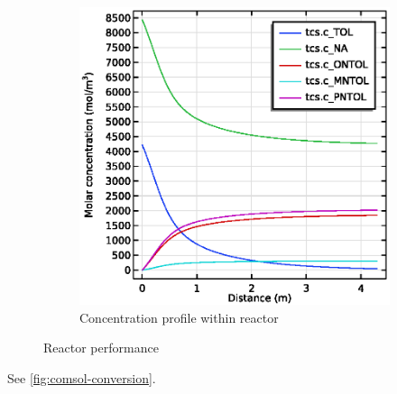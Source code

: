 \begin{figure}[h]
\begin{subfigure}{0.49\linewidth}
        \includegraphics[width=\linewidth, scale=0.5]{figures/concentration.eps}
        \caption{Concentration profile within reactor}
        \label{fig:comsol-performance:concentration}
    \end{subfigure}

    \caption{Reactor performance}
    \label{fig:comsol-performance}
\end{figure}


See \cref{fig:comsol-conversion}.

